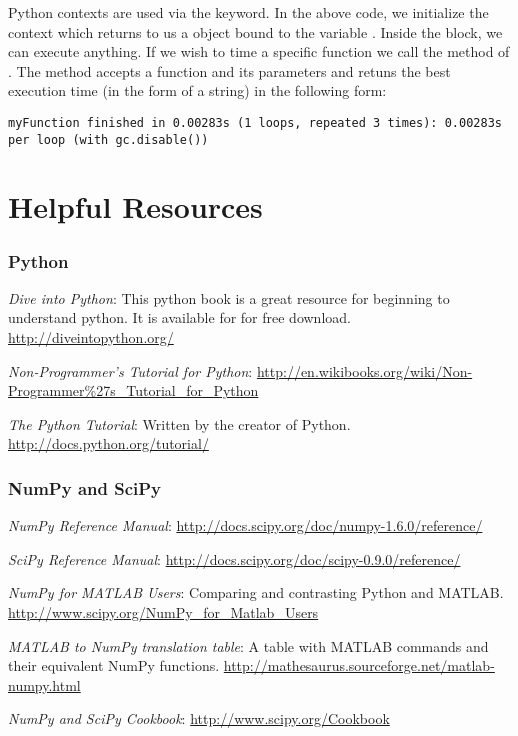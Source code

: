 Python contexts are used via the  keyword.  In the above code, we initialize the  context which returns to us a  object bound to the variable .  Inside the block, we can execute anything.  If we wish to time a specific function we call the  method of .  The  method accepts a function and its parameters and retuns the best execution time (in the form of a string) in the following form:
\begin{lstlisting}
myFunction finished in 0.00283s (1 loops, repeated 3 times): 0.00283s per loop (with gc.disable())
\end{lstlisting}

\section*{Helpful Resources}
\subsubsection*{Python}
\noindent \emph{Dive into Python}:  This python book is a great resource for beginning to understand python.  It is available for for free download. \url{http://diveintopython.org/}

\noindent \emph{Non-Programmer's Tutorial for Python}: \url{http://en.wikibooks.org/wiki/Non-Programmer\%27s_Tutorial_for_Python}

\noindent \emph{The Python Tutorial}: Written by the creator of Python. \url{http://docs.python.org/tutorial/}

\subsubsection*{NumPy and SciPy}
\noindent \emph{NumPy Reference Manual}: \url{http://docs.scipy.org/doc/numpy-1.6.0/reference/}

\noindent \emph{SciPy Reference Manual}: \url{http://docs.scipy.org/doc/scipy-0.9.0/reference/}

\noindent \emph{NumPy for MATLAB Users}: Comparing and contrasting Python and MATLAB. \url{http://www.scipy.org/NumPy_for_Matlab_Users}

\noindent \emph{MATLAB to NumPy translation table}: A table with MATLAB commands and their equivalent NumPy functions.   \url{http://mathesaurus.sourceforge.net/matlab-numpy.html}

\noindent \emph{NumPy and SciPy Cookbook}: \url{http://www.scipy.org/Cookbook}

